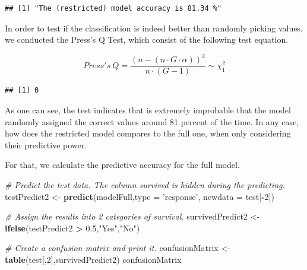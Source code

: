 \documentclass[12,]{article}
\newenvironment{Shaded}{\begin{snugshade}}{\end{snugshade}}
\newcommand{\KeywordTok}[1]{\textcolor[rgb]{0.13,0.29,0.53}{\textbf{#1}}}
\newcommand{\DataTypeTok}[1]{\textcolor[rgb]{0.13,0.29,0.53}{#1}}
\newcommand{\DecValTok}[1]{\textcolor[rgb]{0.00,0.00,0.81}{#1}}
\newcommand{\FloatTok}[1]{\textcolor[rgb]{0.00,0.00,0.81}{#1}}
\newcommand{\StringTok}[1]{\textcolor[rgb]{0.31,0.60,0.02}{#1}}
\newcommand{\CommentTok}[1]{\textcolor[rgb]{0.56,0.35,0.01}{\textit{#1}}}
\newcommand{\OperatorTok}[1]{\textcolor[rgb]{0.81,0.36,0.00}{\textbf{#1}}}
\newcommand{\NormalTok}[1]{#1}
\begin{document}
\begin{verbatim}
## [1] "The (restricted) model accuracy is 81.34 %"
\end{verbatim}

In order to test if the classification is indeed better than randomly
picking values, we conducted the Press's Q Test, which consist of the
following test equation.

\[ Press's~Q = \frac{(n - (n \cdot G \cdot \alpha))^2}{n \cdot(G - 1)} \sim \chi_{1}^{2} \]

\begin{Shaded}
\end{Shaded}

\begin{verbatim}
## [1] 0
\end{verbatim}

As one can see, the test indicates that is extremely improbable that the
model randomly assigned the correct values around 81 percent of the
time. In any case, how does the restricted model compares to the full
one, when only considering their predictive power.

For that, we calculate the predictive accuracy for the full model.

\begin{Shaded}
\begin{Highlighting}[]
  \CommentTok{# Predict the test data. The column survived is hidden during the predicting.}
\NormalTok{testPredict2 <-}\StringTok{ }\KeywordTok{predict}\NormalTok{(modelFull,}\DataTypeTok{type =} \StringTok{'response'}\NormalTok{, }\DataTypeTok{newdata =}\NormalTok{ test[}\OperatorTok{-}\DecValTok{2}\NormalTok{]) }

  \CommentTok{# Assign the results into 2 categories of survival.}
\NormalTok{survivedPredict2 <-}\StringTok{ }\KeywordTok{ifelse}\NormalTok{(testPredict2 }\OperatorTok{>}\StringTok{ }\FloatTok{0.5}\NormalTok{,}\StringTok{"Yes"}\NormalTok{,}\StringTok{"No"}\NormalTok{) }

  \CommentTok{# Create a confusion matrix and print it.}
\NormalTok{confusionMatrix <-}\StringTok{ }\KeywordTok{table}\NormalTok{(test[,}\DecValTok{2}\NormalTok{],survivedPredict2) }
\NormalTok{confusionMatrix}
\end{Highlighting}
\end{Shaded}
\end{document}
